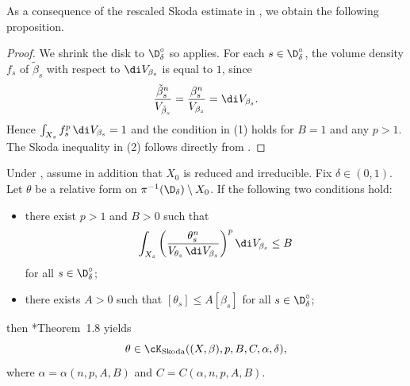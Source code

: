 \documentclass[12pt]{amsart}
\begin{document}
As a consequence of the rescaled Skoda estimate in
, we obtain the following
proposition.


\begin{proof}
We shrink the disk to $\D_\delta^\circ$ so  applies. For each $s \in \D_\delta^\circ$, the volume density $f_s$ of
$\tilde{\beta}_s$ with respect to $\di V_{\beta_s}$ is equal to $1$,
since
\[
\frac{\tilde{\beta}_s^n}{V_{\tilde{\beta}_s}}
=
\frac{\beta_s^n}{V_{\beta_s}}
=
\di V_{\beta_s}.
\]
Hence
\( \int_{X_s} f_s^p \,\di V_{\beta_s} = 1 \) 
and the condition in (1)
holds for $B = 1$ and any $p > 1$.
The Skoda inequality in (2) follows directly from
.
\end{proof}

\begin{remark}
Under , assume in
addition that $X_0$ is reduced and irreducible. Fix $\delta \in (0,1)$.
Let $\theta$ be a relative \Kahler form on
$\pi^{-1}(\D_\delta)\setminus X_0$. If the following two conditions
hold:
\begin{itemize}
\item there exist $p>1$ and $B>0$ such that
\[
\int_{X_s}
\left(\frac{\theta_s^n}{V_{\theta_s}\,\di V_{\beta_s}}\right)^p
\di V_{\beta_s}
\le B
\]
for all $s \in \D_\delta^\circ$;

\item there exists $A>0$ such that $[\theta_s] \le A[\beta_s]$ for all
$s \in \D_\delta^\circ$;
\end{itemize}
then \cite{Guedj-To2025}*{Theorem~1.8} yields
\[
\theta \in \cK_{\rm Skoda}((X, \beta),p,B,C,\alpha,\delta),
\]
where $\alpha = \alpha(n,p,A,B)$ and $C = C(\alpha,n,p,A,B)$.
\end{remark}
\end{document}
